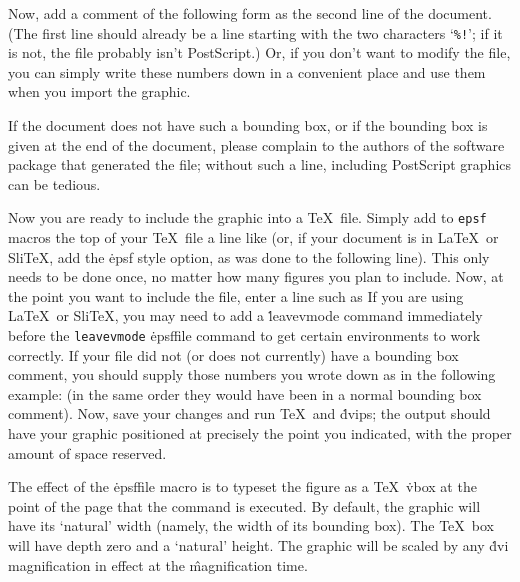 Now, add a comment of the following form as the second line of the document.
(The first line should already be a line starting with the two
characters `{\tt \%!}'; if it is not, the file probably isn't PostScript.)
\noindent
Or, if you don't want to modify the file, you can simply write these
numbers down in a convenient place and use them when you import the
graphic.

If the document does not have such a bounding box, or if the bounding box
is given at the end of the document, please complain to the authors of the
software package that generated the file; without such a line, including
PostScript graphics can be tedious.


Now you are ready to include the graphic into a \TeX\ file.  Simply add to
\^{{\tt epsf} macros}
the top of your \TeX\ file a line like
\noindent
(or, if your document is in La\TeX\ or Sli\TeX, add the \.{epsf} style
option, as was done to the following line).
\noindent
This only needs to be done once, no matter how many figures you plan to
include.  Now, at the point you want to include the file, enter a line
such as
\noindent
If you are using La\TeX\ or Sli\TeX, you may need to add a
\.{\ttbackslash leavevmode} command immediately before the
\^{{\tt leavevmode}}
\.{\ttbackslash epsffile} command to get certain environments to work
correctly.  If your file did not (or does not currently) have a bounding
box comment, you should supply those numbers you wrote down as in the
following example:
\noindent
(in the same order they would have been in a normal bounding box comment).
Now, save your changes and run \TeX\ and \.{dvips}; the output should
have your graphic positioned at precisely the point you indicated, with the
proper amount of space reserved.

The effect of the \.{\ttbackslash epsffile} macro is to typeset the figure
as a \TeX\ \.{\ttbackslash vbox} at the point of the page that the command
is executed.  By default, the graphic will have its
`natural' width (namely, the width of its bounding box).
The \TeX\ box will have depth zero and a `natural' height.
The graphic will be scaled by any \.{dvi} magnification in effect at the
\^{magnification}
time.

